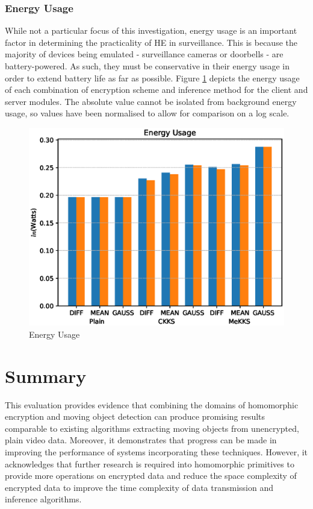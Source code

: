 \setlength{\leftskip}{0cm}
\subsubsection{Energy Usage}
\setlength{\leftskip}{0.5cm}
\indent \indent
While not a particular focus of this investigation, energy usage is an important factor in determining the practicality of HE in surveillance. This is because the majority of devices being emulated - surveillance cameras or doorbells - are battery-powered. As such, they must be conservative in their energy usage in order to extend battery life as far as possible. Figure \ref{fig:energy} depicts the energy usage of each combination of encryption scheme and inference method for the client and server modules. The absolute value cannot be isolated from background energy usage, so values have been normalised to allow for comparison on a log scale.
\begin{figure}[h!]
    \centering
    \includegraphics[scale=0.6]{figures/energyUsage}
    \caption{Energy Usage}
    \label{fig:energy}
\end{figure}

\setlength{\leftskip}{0cm}




\section{Summary}
\setlength{\leftskip}{0.25cm}
\indent \indent
This evaluation provides evidence that combining the domains of homomorphic encryption and moving object detection can produce promising results comparable to existing algorithms extracting moving objects from unencrypted, plain video data. Moreover, it demonstrates that progress can be made in improving the performance of systems incorporating these techniques. However, it acknowledges that further research is required into homomorphic primitives to provide more operations on encrypted data and reduce the space complexity of encrypted data to improve the time complexity of data transmission and inference algorithms.

\setlength{\leftskip}{0cm}
